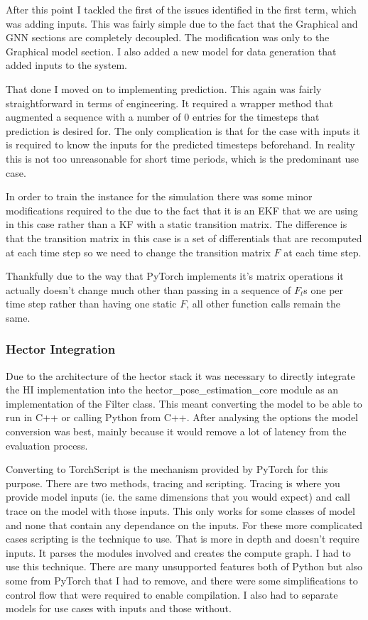 \documentclass[]{../resources/final_report}
\begin{document}
After this point I tackled the first of the issues identified in the first term, which was adding 
inputs. This was fairly simple due to the fact that the Graphical and GNN sections are completely 
decoupled. The modification was only to the Graphical model section. I also added a new model for 
data generation that added inputs to the system.

That done I moved on to implementing prediction. This again was fairly straightforward in terms of
engineering. It required a wrapper method that augmented a sequence with a number of $0$ entries for 
the timesteps that prediction is desired for. The only complication is that for the case with inputs
it is required to know the inputs for the predicted timesteps beforehand. In reality this is not too 
unreasonable for short time periods, which is the predominant use case.

In order to train the instance for the simulation there was some minor modifications required to the 
due to the fact that it is an EKF that we are using in this case rather than a KF with 
a static transition matrix.
The difference is that the transition matrix in this case is a set of differentials that are recomputed at each 
time step so we need to change the transition matrix $F$ at each time step.

Thankfully due to the way that PyTorch implements it's matrix operations it actually doesn't change
much other than passing in a sequence of $F_t$s one per time step rather than having one static $F$,
all other function calls remain the same.


\subsubsection{Hector Integration}

Due to the architecture of the hector stack it was necessary to directly integrate the HI 
implementation into the hector\_pose\_estimation\_core module as an implementation of the Filter
class. This meant converting the model to be able to run in C++ or calling Python from C++.
After analysing the options the model conversion was best, mainly because it would remove a lot
of latency from the evaluation process.

Converting to TorchScript is the mechanism provided by PyTorch for this purpose. There are two 
methods, tracing and scripting. Tracing is where you provide model inputs (ie. the same dimensions
that you would expect) and call trace on the model with those inputs. This only works for some classes
of model and none that contain any dependance on the inputs. For these more complicated cases scripting
is the technique to use. That is more in depth and doesn't require inputs. It parses the modules involved
and creates the compute graph. I had to use this technique. There are many unsupported features both 
of Python but also some from PyTorch that I had to remove, and there were some simplifications to 
control flow that were required to enable compilation. I also had to separate models for use cases with
inputs and those without.
\end{document}
